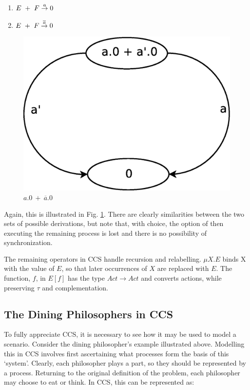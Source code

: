 \begin{enumerate}
\item $E\ +\ F \stackrel{a}{\rightarrow} 0$
\item $E\ +\ F \stackrel{\overline{a}}{\rightarrow} 0$
\end{enumerate}

\begin{figure}  
  \centering
  \includegraphics[scale=0.5]{graph2}
  \caption{$\mathit{a.0\ +\ \overline{a}.0}$}
  \label{fig:graph2}
\end{figure}

Again, this is illustrated in Fig. \ref{fig:graph2}.  There are clearly
similarities between the two sets of possible derivations, but note
that, with choice, the option of then executing the remaining process is
lost and there is no possibility of synchronization.

The remaining operators in CCS handle recursion and relabelling.  $\mu
X.E$ binds X with the value of $E$, so that later occurrences of $X$ are
replaced with $E$.  The function, $f$, in $E[f]$ has the type $Act
\rightarrow Act$ and converts actions, while preserving $\tau$ and
complementation.

\subsection{The Dining Philosophers in CCS}

To fully appreciate CCS, it is necessary to see how it may be used to
model a scenario.  Consider the dining philosopher's example
illustrated above. Modelling this in CCS involves first ascertaining
what processes form the basis of this `system'.  Clearly, each
philosopher plays a part, so they should be represented by a process.
Returning to the original definition of the problem, each philosopher
may choose to eat or think.  In CCS, this can be represented as:

